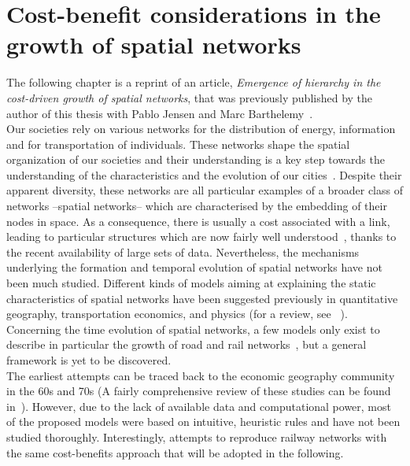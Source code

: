 \chapter{Cost-benefit considerations in the growth of spatial networks}
\label{chap:cost-benefit}

The following chapter is a reprint of an article, \emph{Emergence of hierarchy
in the cost-driven growth of spatial networks}, that was previously published by the author of this
thesis with Pablo Jensen and Marc Barthelemy~\cite{Louf:2013_emergence}.\\

Our societies rely on various networks for the distribution of energy,
information and for transportation of individuals. These networks shape the
spatial organization of our societies and their understanding is a key step
towards the understanding of the characteristics and the evolution of our
cities~\cite{Batty:2013}. Despite their apparent diversity, these networks are
all particular examples of a broader class of networks --spatial networks--
which are characterised by the embedding of their nodes in space. As a
consequence, there is usually a cost associated with a link, leading to
particular structures which are now fairly well
understood~\cite{Barthelemy:2011}, thanks to the recent availability of large
sets of data. Nevertheless, the mechanisms underlying the formation and temporal
evolution of spatial networks have not been much studied. Different kinds of
models aiming at explaining the static characteristics of spatial networks have
been suggested previously in quantitative geography, transportation economics,
and physics (for a review, see ~\cite{Xie:2009}). Concerning the time
evolution of spatial networks, a few models only exist to describe in particular
the growth of road and rail networks~\cite{Levinson:2006, Gastner:2006,
Barthelemy:2008, Courtat:2011}, but a general framework is yet to be
discovered.\\


The earliest attempts can be traced back to the economic geography community in
the 60s and 70s (A fairly comprehensive review of these studies can be found
in~\cite{Haggett:1969}). However, due to the lack of available data and
computational power, most of the proposed models were based on intuitive,
heuristic rules and have not been studied thoroughly. Interestingly,
\cite{Black:1971} attempts to reproduce railway networks with the same
cost-benefits approach that will be adopted in the following.

